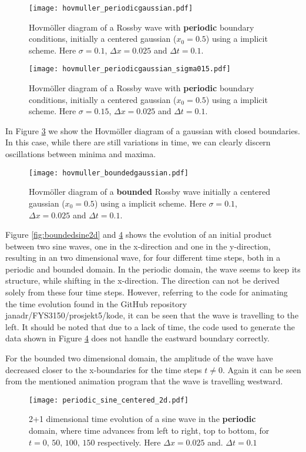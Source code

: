 \begin{figure}[htbp]
	\centering
	\texttt{[image: hovmuller\_periodicgaussian.pdf]}
	\caption{Hovmöller diagram of a Rossby wave with \textbf{periodic} boundary conditions, initially a centered gaussian ($x_0=0.5$) using a implicit scheme. Here $\sigma = 0.1$, $\Delta x = 0.025$ and $\Delta t = 0.1$.}
	\label{fig:hovmollerGaussianPeriodic}
\end{figure}

\begin{figure}[htbp]
	\centering
	\texttt{[image: hovmuller\_periodicgaussian\_sigma015.pdf]}
	\caption{Hovmöller diagram of a Rossby wave with \textbf{periodic} boundary conditions, initially a centered gaussian ($x_0=0.5$) using a implicit scheme. Here $\sigma = 0.15$, $\Delta x = 0.025$ and $\Delta t = 0.1$.}
	\label{fig:hovmollerGaussianPeriodic015}
\end{figure}

In Figure \ref{fig:hovmollerGaussianBounded} we show the Hovmöller diagram of a gaussian with closed boundaries. In this case, while there are still variations in time, we can clearly discern oscillations between minima and maxima.
\begin{figure}[htbp]
	\centering
	\texttt{[image: hovmuller\_boundedgaussian.pdf]}
	\caption{Hovmöller diagram of a \textbf{bounded} Rossby wave initially a centered gaussian ($x_0=0.5$) using a implicit scheme. Here $\sigma = 0.1$, $\Delta x = 0.025$ and $\Delta t = 0.1$.}
	\label{fig:hovmollerGaussianBounded}
\end{figure}

Figure \ref{fig:boundedsine2d} and \ref{fig:periodicsine2d} shows the evolution of an initial product between two sine waves, one in the x-direction and one in the y-direction, resulting in an two dimensional wave, for four different time steps, both in a periodic and bounded domain. In the periodic domain, the wave seems to keep its structure, while shifting in the x-direction. The direction can not be derived solely from these four time steps. However, referring to the code for animating the time evolution found in the GitHub repository janadr/FYS3150/prosjekt5/kode, it can be seen that the wave is travelling to the left. It should be noted that due to a lack of time, the code used to generate the data shown in Figure \ref{fig:periodicsine2d} does not handle the eastward boundary correctly. 

For the bounded two dimensional domain, the amplitude of the wave have decreased closer to the x-boundaries for the time steps $t\neq 0$. Again it can be seen from the mentioned animation program that the wave is travelling westward. 
\begin{figure}[htbp]
	\centering
	\texttt{[image: periodic\_sine\_centered\_2d.pdf]}
	\caption{2+1 dimensional time evolution of a sine wave in the \textbf{periodic} domain, where time advances from left to right, top to bottom, for $t = 0,\, 50,\, 100,\, 150$ respectively. Here $\Delta x = 0.025$ and. $\Delta t = 0.1$}
	\label{fig:periodicsine2d}
\end{figure}

